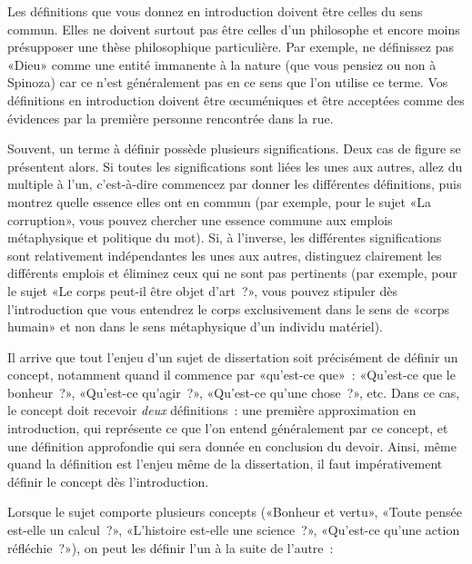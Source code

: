 \documentclass[a4paper,11pt]{article}
\begin{document}
\par

Les définitions que vous donnez en introduction doivent être celles du
sens commun. Elles ne doivent surtout pas être celles d'un philosophe et
encore moins présupposer une thèse philosophique particulière. Par
exemple, ne définissez pas «Dieu» comme une entité immanente à la nature
(que vous pensiez ou non à Spinoza) car ce n'est généralement pas en ce
sens que l'on utilise ce terme. Vos définitions en introduction doivent
être œcuméniques et être acceptées comme des évidences par la première
personne rencontrée dans la rue.

\par

Souvent, un terme à définir possède plusieurs significations. Deux cas
de figure se présentent alors. Si toutes les significations sont liées
les unes aux autres, allez du multiple à l'un, c'est-à-dire commencez
par donner les différentes définitions, puis montrez quelle essence
elles ont en commun (par exemple, pour le sujet «La corruption», vous
pouvez chercher une essence commune aux emplois métaphysique et
politique du mot). Si, à l'inverse, les différentes significations sont
relativement indépendantes les unes aux autres, distinguez clairement
les différents emplois et éliminez ceux qui ne sont pas pertinents (par
exemple, pour le sujet «Le corps peut-il être objet d'art~?», vous
pouvez stipuler dès l'introduction que vous entendrez le corps
exclusivement dans le sens de «corps humain» et non dans le sens
métaphysique d'un individu matériel).

\par

Il arrive que tout l'enjeu d'un sujet de dissertation soit précisément
de définir un concept, notamment quand il commence par «qu'est-ce que»~:
«Qu'est-ce que le bonheur~?», «Qu'est-ce qu'agir~?», «Qu'est-ce qu'une
chose~?», etc. Dans ce cas, le concept doit recevoir \emph{deux}
définitions~: une première approximation en introduction, qui représente
ce que l'on entend généralement par ce concept, et une définition
approfondie qui sera donnée en conclusion du devoir. Ainsi, même quand
la définition est l'enjeu même de la dissertation, il faut
impérativement définir le concept dès l'introduction. 

\par

Lorsque le sujet comporte plusieurs concepts («Bonheur et vertu», «Toute
pensée est-elle un calcul~?», «L'histoire est-elle une science~?»,
«Qu'est-ce qu'une action réfléchie~?»), on peut les définir l'un à la
suite de l'autre~:
\end{document}
